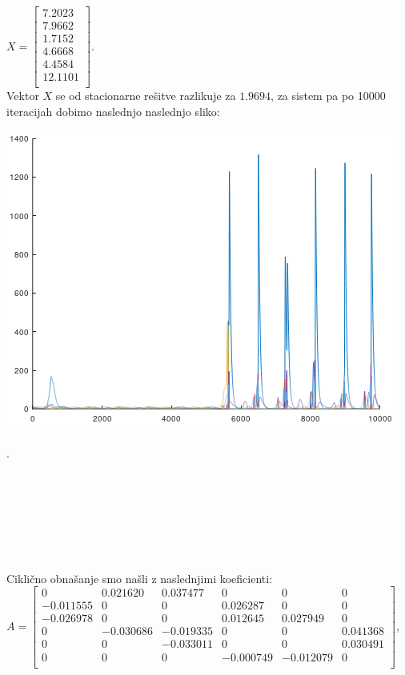\documentclass[a4paper, 12pt]{article}
\begin{document}
$ X =
\begin{bmatrix}
	7.2023 \\
	7.9662 \\
	1.7152 \\
	4.6668 \\
	4.4584 \\
	12.1101 \\
\end{bmatrix} $. \\
Vektor $ X $ se od stacionarne rešitve razlikuje za $ 1.9694 $,
za sistem pa po 10000 iteracijah dobimo naslednjo naslednjo sliko:\\
\begin{center}
	\includegraphics{caos.png}
\end{center}
.
\\
\\
\\
\\
\\
\\
\\
\\
Ciklično obnašanje smo našli z naslednjimi koeficienti:\\
$ A =
\begin{bmatrix}
	0 & 0.021620 & 0.037477 & 0 & 0 & 0 \\
	-0.011555 & 0 & 0 & 0.026287 & 0 & 0 \\
	-0.026978 & 0 & 0 & 0.012645 & 0.027949 & 0 \\
	0 & -0.030686 & -0.019335 & 0 & 0 & 0.041368 \\
	0 & 0 & -0.033011 & 0 & 0 & 0.030491 \\
	0 & 0 & 0 & -0.000749 & -0.012079 & 0 \\
\end{bmatrix} $, 
\end{document}
